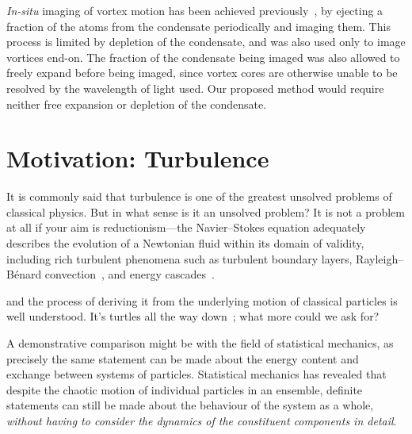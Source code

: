 \emph{In-situ} imaging of vortex motion has been achieved previously~\cite{freilich_real-time_2010}, by ejecting a fraction of the atoms from the condensate periodically and imaging them. This process is limited by depletion of the condensate, and was also used only to image vortices end-on. The fraction of the condensate being imaged was also allowed to freely expand before being imaged, since vortex cores are otherwise unable to be resolved by the wavelength of light used. Our proposed method would require neither free expansion or depletion of the condensate.

\section{Motivation: Turbulence}

It is commonly said that turbulence is one of the greatest unsolved problems of classical physics. But in what sense is it an unsolved problem? It is not a problem at all if your aim is reductionism---the Navier--Stokes equation adequately describes the evolution of a Newtonian fluid within its domain of validity, including rich turbulent phenomena such as turbulent boundary layers, Rayleigh--Bénard convection~\cite{ahlers_trend:_2009}, and energy cascades~\cite{foias_navier-stokes_2001}.
 
and the process of deriving it from the underlying motion of classical particles is well understood. It's turtles all the way down~\cite[p 1]{hawking_brief_1988}; what more could we ask for?

A demonstrative comparison might be with the field of statistical mechanics, as precisely the same statement can be made about the energy content and exchange between systems of particles. Statistical mechanics has revealed that despite the chaotic motion of individual particles in an ensemble, definite statements can still be made about the behaviour of the system as a whole, \emph{without having to consider the dynamics of the constituent components in detail}.

